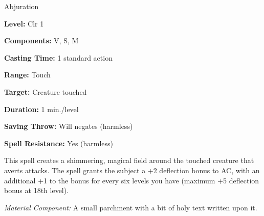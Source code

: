 
Abjuration

\textbf{Level:} Clr 1

\textbf{Components:} V, S, M

\textbf{Casting Time:} 1 standard action

\textbf{Range:} Touch

\textbf{Target:} Creature touched

\textbf{Duration:} 1 min./level

\textbf{Saving Throw:} Will negates (harmless)

\textbf{Spell Resistance:} Yes (harmless)

This spell creates a shimmering, magical field around the touched creature that 
averts attacks. The spell grants the subject a +2 deflection bonus to AC, with 
an additional +1 to the bonus for every six levels you have (maximum +5 deflection 
bonus at 18th level).

\textit{Material Component:} A small parchment with a bit of holy text written 
upon it.

